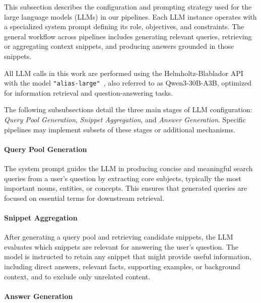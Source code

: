 \documentclass[manuscript,screen]{acmart}
\begin{document}
\begin{CCSXML}
	This subsection describes the configuration and prompting strategy used for the large language models (LLMs) in our pipelines. Each LLM instance operates with a specialized system prompt defining its role, objectives, and constraints. The general workflow across pipelines includes generating relevant queries, retrieving or aggregating context snippets, and producing answers grounded in those snippets.
	
	All LLM calls in this work are performed using the Helmholtz-Blablador API~\cite{blablador_api} with the model \texttt{"alias-large"}~\cite{qwen3_model}, also referred to as Qwen3-30B-A3B, optimized for information retrieval and question-answering tasks.
	
	The following subsubsections detail the three main stages of LLM configuration: \textit{Query Pool Generation}, \textit{Snippet Aggregation}, and \textit{Answer Generation}. Specific pipelines may implement subsets of these stages or additional mechanisms.
	
		\paragraph{Query Pool Generation}
		\label{subsubsec:query-pool-generation}
		
		The system prompt guides the LLM in producing concise and meaningful search queries from a user's question by extracting core subjects, typically the most important nouns, entities, or concepts. This ensures that generated queries are focused on essential terms for downstream retrieval.
		
		\paragraph{Snippet Aggregation}
		\label{subsubsec:snippet-aggregation}
		
		After generating a query pool and retrieving candidate snippets, the LLM evaluates which snippets are relevant for answering the user's question. The model is instructed to retain any snippet that might provide useful information, including direct answers, relevant facts, supporting examples, or background context, and to exclude only unrelated content.
		
		\paragraph{Answer Generation}
		\label{subsubsec:answer-generation}
		

\end{CCSXML}
\end{document}
